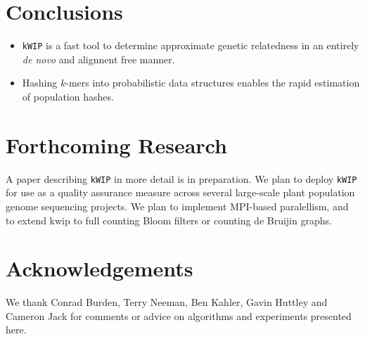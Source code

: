 \documentclass[a0,portrait]{a0poster}
\begin{document}
\begin{multicols}{2}
\color{SaddleBrown}

\section*{Conclusions}

\begin{itemize}
  \item \texttt{kWIP} is a fast tool to determine approximate genetic
    relatedness in an entirely \textit{de novo} and alignnent free manner.
  \item Hashing $k$-mers into probabilistic data structures enables the rapid
    estimation of population hashes.
\end{itemize}

\color{Black}


\section*{Forthcoming Research}

A paper describing \texttt{kWIP} in more detail is in preparation. We plan to
deploy \texttt{kWIP} for use as a quality assurance measure across several
large-scale plant population genome sequencing projects. We plan to implement
MPI-based paralellism, and to extend kwip to full counting Bloom filters or
counting de Bruijin graphs.

\printbibliography


\section*{Acknowledgements}

We thank Conrad Burden, Terry Neeman, Ben Kahler, Gavin Huttley and Cameron
Jack for comments or advice on algorithms and experiments presented here.


\end{multicols}
\end{document}
